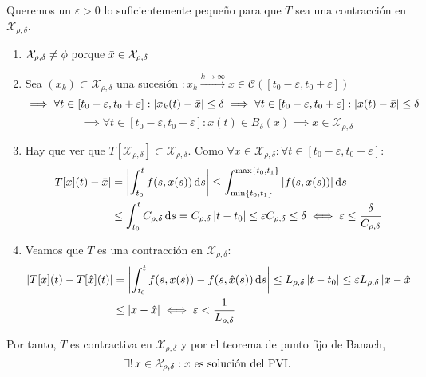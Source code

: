 \begin{teo}
\begin{dem}
		Queremos un $\varepsilon > 0$ lo suficientemente pequeño para que $T$ sea una contracción en $\mathcal{X}_{\rho, \delta}$.
		\begin{enumerate}
			\item $\mathcal{X}_{\rho, \delta} \ne \phi \text{ porque } \bar{x} \in \mathcal{X}_{\rho, \delta}$
			\item Sea $(x_k) \subset \mathcal{X}_{\rho, \delta}$ una sucesión $: x_k \xrightarrow{k\to \infty} x \in \mathcal{C}([t_0-\varepsilon, t_0+\varepsilon])$
			      \[\implies \forall t \in [t_0-\varepsilon, t_0+\varepsilon] : \left|x_k(t) - \bar{x}\right| \leq \delta \implies \forall t \in [t_0-\varepsilon, t_0+\varepsilon] : \left|x(t) - \bar{x}\right| \leq \delta\]
			      \[\implies \forall t \in [t_0-\varepsilon, t_0+\varepsilon] : x(t) \in B_\delta(\bar{x}) \implies x \in \mathcal{X}_{\rho, \delta}\]
			\item Hay que ver que $T[\mathcal{X}_{\rho, \delta}] \subset \mathcal{X}_{\rho, \delta}$. Como $\forall x \in \mathcal{X}_{\rho, \delta} : \forall t \in [t_0-\varepsilon, t_0+\varepsilon] :$
			      \[\begin{aligned}
					      \abs{T[x](t) - \bar{x}} & = \abs{\int_{t_0}^{t} f(s, x(s)) \odif{s}} \leq \int_{\min\{t_0,t_1\}}^{\max\{t_0, t_1\}} \abs{f(s, x(s))} \odif{s}                                                              \\
					                              & \leq \int_{t_0}^{t} C_{\rho, \delta} \odif{s} = C_{\rho, \delta} \abs{t-t_0} \leq \varepsilon C_{\rho, \delta} \leq \delta \iff \varepsilon \leq \frac{\delta}{C_{\rho, \delta}}
				      \end{aligned}\]
			\item Veamos que $T$ es una contracción en $\mathcal{X}_{\rho, \delta}$:
			      \[\begin{aligned}
					      \abs{T[x](t) - T[\hat{x}](t)} & = \abs{\int_{t_0}^{t} f(s, x(s)) - f(s, \hat{x}(s)) \odif{s}} \leq L_{\rho, \delta} \abs{t - t_0} \leq \varepsilon L_{\rho, \delta} \abs{x - \hat{x}} \\
					                                    & \leq \abs{x - \hat{x}} \iff \varepsilon < \frac{1}{L_{\rho, \delta}}
				      \end{aligned}\]
		\end{enumerate}
		Por tanto, $T$ es contractiva en $\mathcal{X}_{\rho, \delta}$ y por el teorema de punto fijo de Banach,
		\[\exists! \, x \in \mathcal{X}_{\rho, \delta} : x \text{ es solución del PVI.}\]
	\end{dem}
\end{teo}

